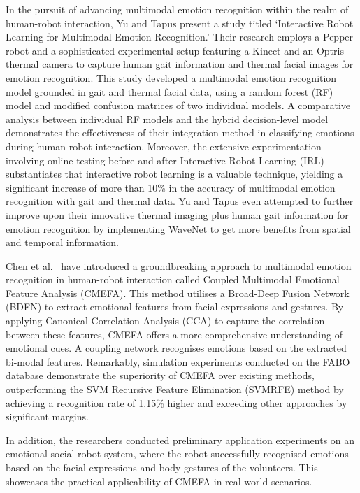 In the pursuit of advancing multimodal emotion recognition within the realm of human-robot interaction, Yu and Tapus \cite{Yu2019-ku} present a study titled `Interactive Robot Learning for Multimodal Emotion Recognition.' Their research employs a Pepper robot and a sophisticated experimental setup featuring a Kinect and an Optris thermal camera to capture human gait information and thermal facial images for emotion recognition. This study developed a multimodal emotion recognition model grounded in gait and thermal facial data, using a random forest (RF) model and modified confusion matrices of two individual models. A comparative analysis between individual RF models and the hybrid decision-level model demonstrates the effectiveness of their integration method in classifying emotions during human-robot interaction. Moreover, the extensive experimentation involving online testing before and after Interactive Robot Learning (IRL) substantiates that interactive robot learning is a valuable technique, yielding a significant increase of more than 10\% in the accuracy of multimodal emotion recognition with gait and thermal data. Yu and Tapus \cite{Yu2020-zq} even attempted to further improve upon their innovative thermal imaging plus human gait information for emotion recognition by implementing WaveNet to get more benefits from spatial and temporal information.

Chen et al.\ \cite{Chen2023-ss} have introduced a groundbreaking approach to multimodal emotion recognition in human-robot interaction called Coupled Multimodal Emotional Feature Analysis (CMEFA). This method utilises a Broad-Deep Fusion Network (BDFN) to extract emotional features from facial expressions and gestures. By applying Canonical Correlation Analysis (CCA) to capture the correlation between these features, CMEFA offers a more comprehensive understanding of emotional cues. A coupling network recognises emotions based on the extracted bi-modal features. Remarkably, simulation experiments conducted on the FABO database demonstrate the superiority of CMEFA over existing methods, outperforming the SVM Recursive Feature Elimination (SVMRFE) method by achieving a recognition rate of 1.15\% higher and exceeding other approaches by significant margins.

In addition, the researchers conducted preliminary application experiments on an emotional social robot system, where the robot successfully recognised emotions based on the facial expressions and body gestures of the volunteers. This showcases the practical applicability of CMEFA in real-world scenarios.

